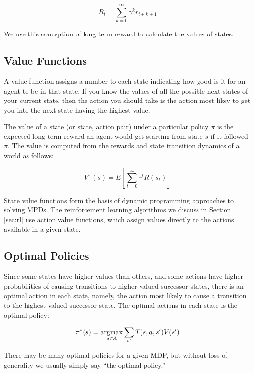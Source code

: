 \begin{equation}
R_t = \sum_{k=0}^{\infty} \gamma^k r_{t+k+1}
\end{equation}

We use this conception of long term reward to calculate the values of states.

\subsection{Value Functions}

A value function assigns a number to each state indicating how good is it for an agent to be in that state. If you know the values of all the possible next states of your current state, then the action you should take is the action most likey to get you into the next state having the highest value.

The value of a state (or state, action pair) under a particular policy $\pi$ is the expected long term reward an agent would get starting from state $s$ if it followed $\pi$. The value is computed from the rewards and state transition dynamics of a world as follows:

\begin{equation}
V^\pi(s) = E \left [ \sum_{t=0}^{\infty} \gamma^t R(s_t) \right ]
\end{equation}

State value functions form the basis of dynamic programming approaches to solving MPDs. The reinforcement learning algorithms we discuss in Section \ref{sec:rl} use action value functions, which assign values directly to the actions available in a given state.

\subsection{Optimal Policies}

Since some states have higher values than others, and some actions have higher probabilities of causing transitions to higher-valued successor states, there is an optimal action in each state, namely, the action most likely to cause a transition to the highest-valued successor state. The optimal actions in each state is the optimal policy:

\begin{equation}
\pi^*(s) = \operatorname*{argmax}_{a \in A} \sum_{s'} T(s, a, s') V(s')
\end{equation}

There may be many optimal policies for a given MDP, but without loss of generality we usually simply say ``the optimal policy.''


